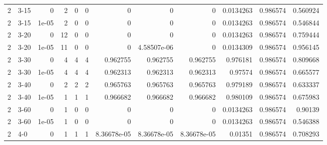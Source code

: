 \begin{tabular}{rlrrrrrrrrrr}
     2 & 3-15   &      0     &           2 &                 0 &                 0 &     0           &     0           &      0           &        0.0134263 &               0.986574 &           0.560924 \\
     2 & 3-15   &      1e-05 &           2 &                 0 &                 0 &     0           &     0           &      0           &        0.0134263 &               0.986574 &           0.546844 \\
     2 & 3-20   &      0     &          12 &                 0 &                 0 &     0           &     0           &      0           &        0.0134263 &               0.986574 &           0.759444 \\
     2 & 3-20   &      1e-05 &          11 &                 0 &                 0 &     0           &     4.58507e-06 &      0           &        0.0134309 &               0.986574 &           0.956145 \\
     2 & 3-30   &      0     &           4 &                 4 &                 4 &     0.962755    &     0.962755    &      0.962755    &        0.976181  &               0.986574 &           0.809668 \\
     2 & 3-30   &      1e-05 &           4 &                 4 &                 4 &     0.962313    &     0.962313    &      0.962313    &        0.97574   &               0.986574 &           0.665577 \\
     2 & 3-40   &      0     &           2 &                 2 &                 2 &     0.965763    &     0.965763    &      0.965763    &        0.979189  &               0.986574 &           0.633337 \\
     2 & 3-40   &      1e-05 &           1 &                 1 &                 1 &     0.966682    &     0.966682    &      0.966682    &        0.980109  &               0.986574 &           0.675983 \\
     2 & 3-60   &      0     &           1 &                 0 &                 0 &     0           &     0           &      0           &        0.0134263 &               0.986574 &           0.90139  \\
     2 & 3-60   &      1e-05 &           1 &                 0 &                 0 &     0           &     0           &      0           &        0.0134263 &               0.986574 &           0.546388 \\
     2 & 4-0    &      0     &           1 &                 1 &                 1 &     8.36678e-05 &     8.36678e-05 &      8.36678e-05 &        0.01351   &               0.986574 &           0.708293 \\

\end{tabular}
